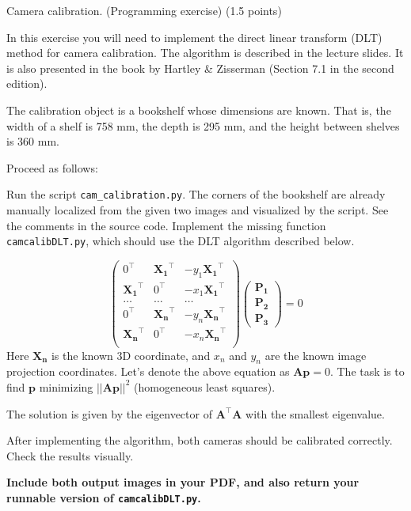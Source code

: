 \documentclass[12pt]{article} %
\newenvironment{exercise}[2][Task]{\begin{trivlist}
\item[\hskip \labelsep {\bfseries #1}\hskip \labelsep {\bfseries #2.}]}{\end{trivlist}}
\begin{document}
\begin{exercise}{2}
Camera calibration. (Programming exercise) (1.5 points)

\vspace{1mm}
\noindent In this exercise you will need to implement the direct linear transform (DLT) method for camera calibration. The algorithm is described in the lecture slides. It is also presented in the book by Hartley \& Zisserman (Section 7.1 in the second edition).

The calibration object is a bookshelf whose dimensions are known. That is, the width of a shelf is 758 mm, the depth is 295 mm, and the height between shelves is 360 mm. 
\newline

\noindent Proceed as follows:


\noindent Run the script \texttt{cam\_calibration.py}. The corners of the bookshelf are already manually localized from the given two images and visualized by the script. See the comments in the source code.
 Implement the missing function \texttt{camcalibDLT.py}, which should use the DLT algorithm described below.
 
\begin{equation*}
	\begin{pmatrix}0^\top & \mathbf{X_1}^\top & -y_1\mathbf{X_1}^\top\\
				   \mathbf{X_1}^\top & 0^\top & -x_1\mathbf{X_1}^\top \\
				   \dots & \dots & \dots\\
				   0^\top & \mathbf{X_n}^\top & -y_n\mathbf{X_n}^\top\\
				   \mathbf{X_n}^\top & 0^\top & -x_n\mathbf{X_n}^\top \\
	 \end{pmatrix}
	\begin{pmatrix}\mathbf{P_1} \\ \mathbf{P_2} \\ \mathbf{P_3} \end{pmatrix}
	 = 0
\end{equation*}
Here $\mathbf{X_n}$ is the known 3D coordinate, and $x_n$ and $y_n$ are the known image projection coordinates. Let's denote the above equation as $\mathbf{A}\mathbf{p}=0$. The task is to find $\mathbf{p}$  minimizing $||\mathbf{Ap}||^2$ (homogeneous least squares).

\noindent The solution is given by the eigenvector of $\mathbf{A}^\top\mathbf{A}$ with the smallest eigenvalue.
\newline

\noindent After implementing the algorithm, both cameras should be calibrated correctly. Check the results visually.

\noindent \textbf{Include both output images in your PDF, and also return your runnable version of \texttt{camcalibDLT.py}.}

\end{exercise}
\end{document}
